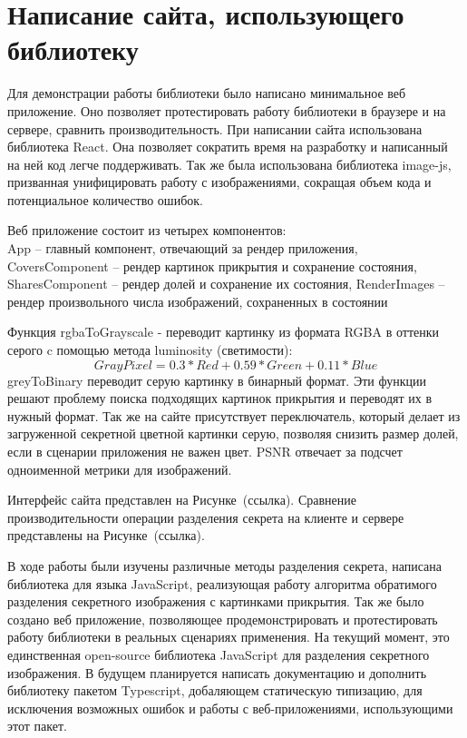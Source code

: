\documentclass[a4paper,article,14pt]{extarticle}
\begin{document}
\newpage
\section{Написание сайта, использующего библиотеку}

Для демонстрации работы библиотеки было написано минимальное веб приложение. Оно позволяет протестировать работу библиотеки в
браузере и на сервере, сравнить производительность.
При написании сайта использована библиотека \flqq React\frqq\cite{react}. Она позволяет сократить время на разработку 
и написанный на ней код легче поддерживать.
Так же была использована библиотека \flqq image-js\frqq\cite{image-js}, призванная унифицировать работу с изображениями, сокращая объем кода и потенциальное
количество ошибок.

Веб приложение состоит из четырех компонентов: \\ 
App -- главный компонент, отвечающий за рендер приложения, \\
CoversComponent -- рендер картинок прикрытия и сохранение состояния,
SharesComponent -- рендер долей и сохранение их состояния, 
RenderImages -- рендер произвольного числа изображений, сохраненных в состоянии

Функция rgbaToGrayscale - переводит картинку из формата RGBA в оттенки серого c помощью метода luminosity (светимости): 
$$ GrayPixel = 0.3*Red + 0.59*Green + 0.11*Blue$$
greyToBinary переводит серую картинку в бинарный формат. Эти функции решают проблему поиска подходящих картинок прикрытия и переводят их в нужный формат.
Так же на сайте присутствует переключатель, который делает из загруженной секретной цветной картинки серую, позволяя снизить размер долей,
если в сценарии приложения не важен цвет. PSNR отвечает за подсчет одноименной метрики для изображений. 

Интерфейс сайта представлен на Рисунке~(ссылка). Сравнение производительности операции разделения секрета на клиенте и сервере
представлены на Рисунке~(ссылка).


\newpage
{}
В ходе работы были изучены различные методы разделения секрета, написана библиотека для языка JavaScript, реализующая работу алгоритма 
обратимого разделения секретного изображения с картинками прикрытия. Так же было создано веб приложение, позволяющее продемонстрировать и 
протестировать работу библиотеки в реальных сценариях применения. На текущий момент, это единственная open-source библиотека JavaScript для 
разделения секретного изображения. В будущем планируется написать документацию и дополнить библиотеку пакетом Typescript, 
добаляющем статическую типизацию, для исключения возможных ошибок и работы с веб-приложениями, использующими этот пакет.
\end{document}
